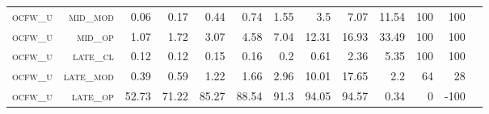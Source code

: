 \begin{landscape}
\begin{table}[!htbp]
\begin{tabular}{@{}rrrrrrrrrr|rrr@{}}
\footnotesize \textsc{ocfw\_u}     & \footnotesize \textsc{mid\_mod  }                & \footnotesize 0.06          & \footnotesize 0.17           & \footnotesize 0.44             & \footnotesize 0.74            & \footnotesize 1.55            & \footnotesize 3.5             & \footnotesize 7.07       & \footnotesize 11.54    & \footnotesize 100    & \footnotesize 100    \\
\footnotesize \textsc{ocfw\_u}     & \footnotesize \textsc{mid\_op   }                & \footnotesize 1.07          & \footnotesize 1.72           & \footnotesize 3.07             & \footnotesize 4.58            & \footnotesize 7.04            & \footnotesize 12.31           & \footnotesize 16.93      & \footnotesize 33.49    & \footnotesize 100    & \footnotesize 100    \\
\footnotesize \textsc{ocfw\_u}     & \footnotesize \textsc{late\_cl  }                & \footnotesize 0.12          & \footnotesize 0.12           & \footnotesize 0.15             & \footnotesize 0.16            & \footnotesize 0.2             & \footnotesize 0.61            & \footnotesize 2.36       & \footnotesize 5.35     & \footnotesize 100    & \footnotesize 100    \\
\footnotesize \textsc{ocfw\_u}     & \footnotesize \textsc{late\_mod }                & \footnotesize 0.39          & \footnotesize 0.59           & \footnotesize 1.22             & \footnotesize 1.66            & \footnotesize 2.96            & \footnotesize 10.01           & \footnotesize 17.65      & \footnotesize 2.2      & \footnotesize 64     & \footnotesize 28    \\
\footnotesize \textsc{ocfw\_u}     & \footnotesize \textsc{late\_op  }                & \footnotesize 52.73         & \footnotesize 71.22          & \footnotesize 85.27            & \footnotesize 88.54           & \footnotesize 91.3            & \footnotesize 94.05           & \footnotesize 94.57      & \footnotesize 0.34     & \footnotesize 0      & \footnotesize -100    \\
\end{tabular}
\end{table}
\end{landscape}


